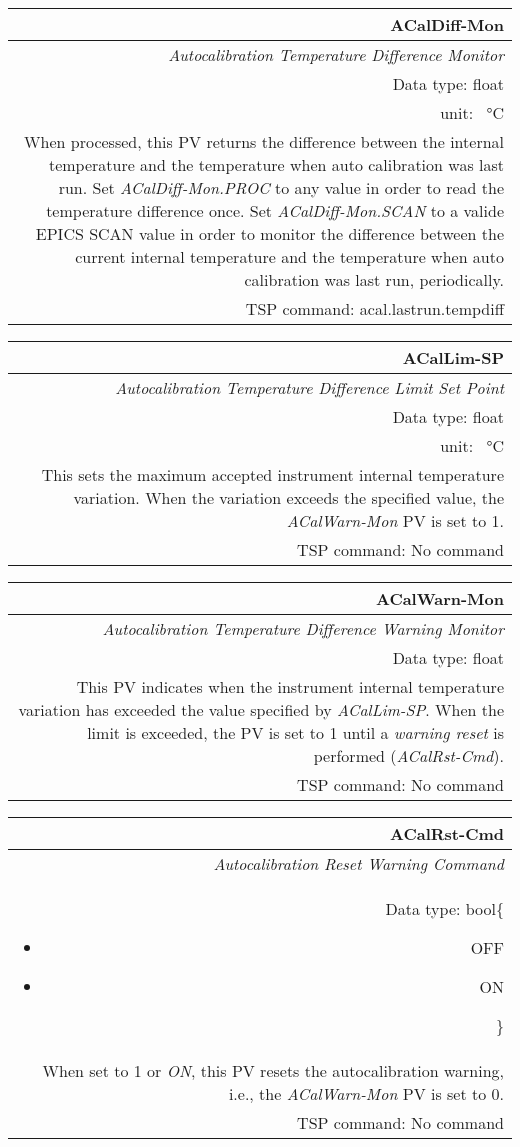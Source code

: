 \documentclass[openany]{article}
\begin{document}
		\begin{tabular}{N}
			\hline
			\bfseries ACalDiff-Mon\label{pv:acaldiff-mon} \\ \hline
			\emph{Autocalibration Temperature Difference Monitor} \\
			Data type: float \\
			unit: \SI{}{\degreeCelsius} \\
			When processed, this PV returns the difference between the internal temperature and the temperature when auto calibration was last run. Set \emph{ACalDiff-Mon.PROC} to any value in order to read the temperature difference once. Set \emph{ACalDiff-Mon.SCAN} to a valide EPICS SCAN value in order to monitor the difference between the current internal temperature and the temperature when auto calibration was last run, periodically. \\
			TSP command: acal.lastrun.tempdiff
		\end{tabular}

		\begin{tabular}{N}
			\hline
			\bfseries ACalLim-SP\label{pv:acallim-sp} \\ \hline
			\emph{Autocalibration Temperature Difference Limit Set Point} \\
			Data type: float \\
			unit: \SI{}{\degreeCelsius} \\
			This sets the maximum accepted instrument internal temperature variation. When the variation exceeds the specified value, the \emph{ACalWarn-Mon} PV is set to 1. \\
			TSP command: No command
		\end{tabular}

		\begin{tabular}{N}
			\hline
			\bfseries ACalWarn-Mon\label{pv:acalwarn-mon} \\ \hline
			\emph{Autocalibration Temperature Difference Warning Monitor} \\
			Data type: float \\
			This PV indicates when the instrument internal temperature variation has exceeded the value specified by \emph{ACalLim-SP}. When the limit is exceeded, the PV is set to 1 until a \emph{warning reset} is performed (\emph{ACalRst-Cmd}). \\
			TSP command: No command
		\end{tabular}

		\begin{tabular}{N}
			\hline
			\bfseries ACalRst-Cmd\label{pv:acalrst-cmd} \\ \hline
			\emph{Autocalibration Reset Warning Command} \\
			Data type: bool\{\begin{itemize}[noitemsep]
				\small
				\item[] OFF
				\item[] ON
			\end{itemize}\} \\
			When set to 1 or \emph{ON}, this PV resets the autocalibration warning, i.e., the \emph{ACalWarn-Mon} PV is set to 0. \\
			TSP command: No command
		\end{tabular}
\end{document}
